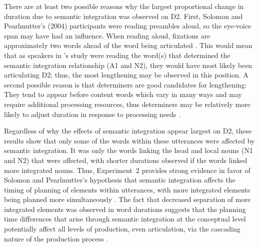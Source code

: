 \documentclass[12pt,titlepage]{article}
\newcommand{\IGNORE}[1]{} %
\begin{document}
There are at least two possible reasons why the largest proportional change in duration due to semantic integration was observed on D2.  First, Solomon and Pearlmutter's (2004) participants were reading preambles aloud, so the eye-voice span may have had an influence. When reading aloud, fixations are approximately two words ahead of the word being articulated \cite{InhoffEtAl11, EyeVoiceSpan}. This would mean that as speakers in \citeauthor{SolomonPearlmutter04}'s study were reading the word(s) that determined the semantic integration relationship (A1 and N2), they would have most likely been articulating D2; thus, the most lengthening may be observed in this position. A second possible reason is that determiners are good candidates for lengthening: They tend to appear before content words which vary in many ways and may require additional processing resources, thus determiners may be relatively more likely to adjust duration in response to processing needs \cite{BellEtAl09, FoxTreeClark97, JaegerKidd08}. 

\IGNORE{
are easily accessible, appear before content words which vary in many ways and may require additional processing resources, and determiners tend to have both reduced and unreduced forms, it is likely that determiners may adjust duration easily in response to processing needs.


This has been suggested because determiners are high frequency, accessible, function words \cite{BellEtAl09, FoxTreeClark97, JaegerKidd08}. }

\IGNORE{
There was no evidence of prosodic breaks stronger than those expected after a word separating N1 and N2. It is not surprising that speakers were unlikely to produce evidence for breaks within these fairly short preambles. If they had, speakers would have had to produce breaks after a single prosodic word (i.e., the head noun and its determiner). If prosodic break placement is partially driven by recovery, as suggested by \citeA{WatsonEtAl06}, there would not be much to recover from at this point in the utterance, making these ideal preambles to examine the effects of semantic integration on word durations in the absence of prosodic breaks.}

Regardless of why the effects of semantic integration appear largest on D2, these results show that only some of the words within these utterances were affected by semantic integration. It was only the words linking the head and local nouns (N1 and N2) that were affected, with shorter durations observed if the words linked more integrated nouns. Thus, Experiment~2 provides strong evidence in favor of Solomon and Pearlmutter's \citeyear{SolomonPearlmutter04} hypothesis that semantic integration affects the timing of planning of elements within utterances, with more integrated elements being planned more simultaneously \cite<see also>{GillespiePearlmutter11, PearlmutterSolomonCUNY07}. The fact that decreased separation of more integrated elements was observed in word durations suggests that the planning time differences that arise through semantic integration at the conceptual level potentially affect all levels of production, even articulation, via the cascading nature of the production process \cite{BockLevelt94}. 
\end{document}
